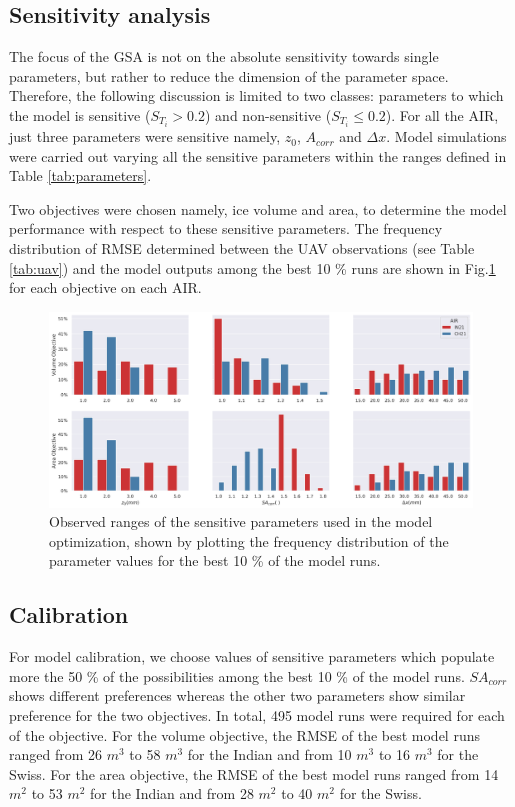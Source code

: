 \documentclass[utf8]{frontiersSCNS} %
\begin{document}
\subsection{Sensitivity analysis}

The focus of the GSA is not on the absolute sensitivity towards single parameters, but rather to reduce the dimension
of the parameter space. Therefore, the following discussion is limited to two classes: parameters to which the model is
sensitive ($S_{T_{i}} > 0.2$) and non-sensitive ($S_{T_{i}} \leq 0.2$). For all the AIR, just three parameters were sensitive namely, $z_{0}$, $A_{corr}$ and $\Delta x$. Model simulations
were carried out varying all the sensitive parameters within the ranges defined in Table \ref{tab:parameters}.

Two objectives were chosen namely, ice volume and area, to determine the model performance with respect to these
sensitive parameters. The frequency distribution  of RMSE determined between the UAV observations (see Table
\ref{tab:uav}) and the model outputs among the best 10 \% runs are shown in Fig.\ref{fig:param_hist} for each
objective on each AIR.

\begin{figure}
	\begin{center}
		\includegraphics[width=\linewidth]{Figures/param_hist.jpg}
	\end{center}
	\caption{Observed ranges of the sensitive parameters used in the model optimization, shown by
		plotting the frequency distribution of the parameter values for the best 10 \% of the model runs. }
	\label{fig:param_hist}
\end{figure}

\subsection{Calibration}

For model calibration, we choose values of sensitive parameters which populate more the 50 \% of the possibilities
among the best 10 \% of the model runs. $SA_{corr}$ shows different preferences whereas the other two parameters
show similar preference for the two objectives. In total, 495 model runs were required for each of the objective.
For the volume objective, the RMSE of the best model runs ranged from 26 $m^3$ to 58 $m^3$ for the Indian and from
10 $m^3$ to 16 $m^3$ for the Swiss. For the area objective, the RMSE of the best model runs ranged from 14 $m^2$ to
53 $m^2$ for the Indian and from 28 $m^2$ to 40 $m^2$ for the Swiss.
\end{document}
